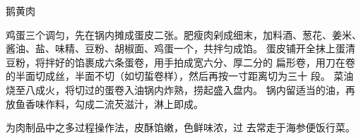 \begin{recipe}{鹅黄肉}

\ingredients


\cooking

\step 鸡蛋三个调匀，先在锅内摊成蛋皮二张。肥瘦肉剁成细末，加料酒、葱花、姜米、
酱油、盐、味精、豆粉、胡椒面、鸡蛋一个，共拌匀成馅。
\step 蛋皮铺开全抹上蛋清豆粉，将拌好的馅裹成六条蛋卷，用手拍成宽六分、厚二分的
扁形卷，用刀在卷的半面切成丝，半面不切（如切蜇卷样），然后再按一寸距离切为三十
段。
\step 菜油烧至八成火，将切过的蛋卷入油锅内炸熟，捞起盛入盘内。
\step 锅内留适当的油，再放鱼香味作料，勾成二流芡滋汁，淋上即成。

\features

为肉制品中之多过程操作法，皮酥馅嫩，色鲜味浓，过 去常走于海参便饭行菜。

\end{recipe}

